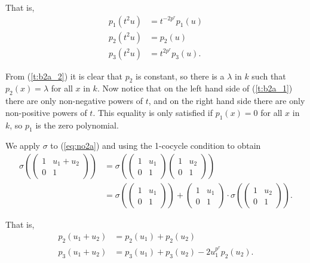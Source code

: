 	That is,
	\begin{align}
	\label{t:b2a_1}
	p_1(t^2u) &= t^{-2p^r} p_1(u) \\
							 \label{t:b2a_2}
							 p_2(t^2u) &= p_2(u) \\
														\label{t:b2a_3}
														p_3(t^2u) &=  t^{2p^r}p_3(u).
														\end{align}

														From (\ref{t:b2a_2}) it is clear that $p_2$ is constant, so there is a $\lambda$ in $k$ such that $p_2(x)=\lambda$ for all $x$ in $k$. Now notice that on the left hand side of (\ref{t:b2a_1}) there are only non-negative powers of $t$, and on the right hand side there are only non-positive powers of $t$. This equality is only satisfied if $p_1(x)=0$ for all $x$ in $k$, so $p_1$ is the zero polynomial.

														We apply $\sigma$ to (\ref{eq:no2a}) and using the 1-cocycle condition to obtain
														\begin{align*}
	\sigma\left(
			\left(\begin{matrix} 1 & u_1 + u_2 \\ 0 & 1 \end{matrix}\right)
			\right)
	&=
	\sigma\left(
			\left(\begin{matrix} 1 & u_1 \\ 0 & 1 \end{matrix}\right) 
			\left(\begin{matrix} 1 & u_2 \\ 0 & 1 \end{matrix}\right)
			\right) \\
		&=
	\sigma\left(
			\left(\begin{matrix} 1 & u_1 \\ 0 & 1 \end{matrix}\right)
			\right) +
	\left(\begin{matrix} 1 & u_1 \\ 0 & 1 \end{matrix}\right) \cdot
	\sigma\left(
			\left(\begin{matrix} 1 & u_2 \\ 0 & 1 \end{matrix}\right)
			\right).
	\end{align*}

	That is,
	\begin{align}
	\label{u:b2a_1}
	p_2(u_1 + u_2) &= p_2(u_1) + p_2(u_2) \\
										\label{u:b2a_2}
										p_3(u_1 + u_2) &= p_3(u_1) + p_3(u_2) - 2u_1^{p^r}p_2(u_2).
										\end{align}


